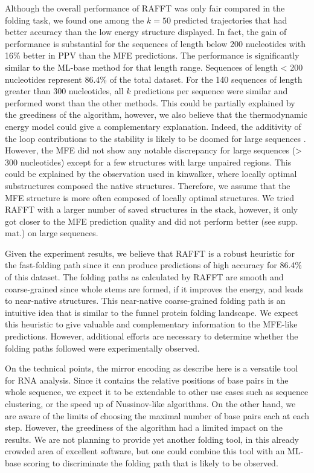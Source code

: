 \documentclass[a4paper,12pt]{article}
\begin{document}
{{Although the overall performance of RAFFT was only fair compared in the folding
task, we found one among the \(k=50\) predicted trajectories that had better
accuracy than the low energy structure displayed. In fact, the gain of
performance is substantial for the sequences of length below 200 nucleotides
with 16\% better in PPV than the MFE predictions. The performance is
significantly similar to the ML-base method for that length range. Sequences of
length \textless{} 200 nucleotides represent 86.4\% of the total dataset. For the 140
sequences of length greater than 300 nucleotides, all \(k\) predictions per
sequence were similar and performed worst than the other methods. This could be
partially explained by the greediness of the algorithm, however, we also believe
that the thermodynamic energy model could give a complementary explanation.
Indeed, the additivity of the loop contributions to the stability is likely to
be doomed for large sequences \cite{tinoco99_how_rna_folds}. However, the MFE did
not show any notable discrepancy for large sequences (\textgreater{} 300 nucleotides)
except for a few structures with large unpaired regions. This could be explained
by the observation used in kinwalker, where locally optimal substructures
composed the native structures. Therefore, we assume that the MFE structure is
more often composed of locally optimal structures. We tried RAFFT with a larger
number of saved structures in the stack, however, it only got closer to the MFE
prediction quality and did not perform better (see supp. mat.) on large
sequences.

Given the experiment results, we believe that RAFFT is a robust heuristic for
the fast-folding path since it can produce predictions of high accuracy for
86.4\% of this dataset. The folding paths as calculated by RAFFT are smooth and
coarse-grained since whole stems are formed, if it improves the energy, and
leads to near-native structures. This near-native coarse-grained folding path is
an intuitive idea that is similar to the funnel protein folding landscape. We
expect this heuristic to give valuable and complementary information to the
MFE-like predictions. However, additional efforts are necessary to determine
whether the folding paths followed were experimentally observed.

On the technical points, the mirror encoding as describe here is a versatile
tool for RNA analysis. Since it contains the relative positions of base pairs in
the whole sequence, we expect it to be extendable to other use cases such as
sequence clustering, or the speed up of Nussinov-like algorithms. On the other
hand, we are aware of the limits of choosing the maximal number of base pairs
each at each step. However, the greediness of the algorithm had a limited impact
on the results. We are not planning to provide yet another folding tool, in this
already crowded area of excellent software, but one could combine this tool with
an ML-base scoring to discriminate the folding path that is likely to be
observed.

}}
\end{document}
